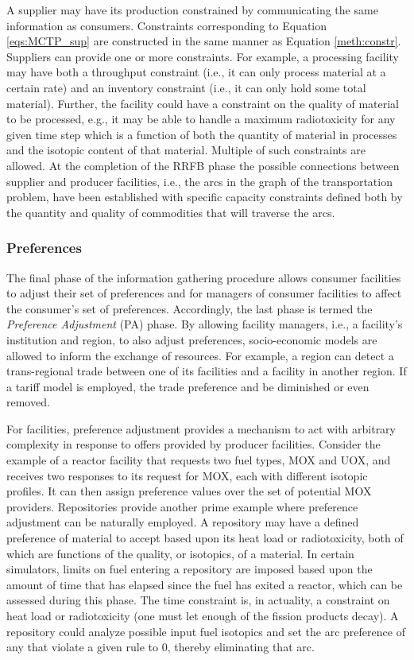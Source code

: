 A supplier may have its production constrained by communicating the same
information as consumers. Constraints corresponding to Equation
\ref{eqs:MCTP_sup} are constructed in the same manner as Equation
\ref{meth:constr}. Suppliers can provide one or more constraints. For example, a
processing facility may have both a throughput constraint (i.e., it can only
process material at a certain rate) and an inventory constraint (i.e., it can
only hold some total material). Further, the facility could have a constraint on
the quality of material to be processed, e.g., it may be able to handle a
maximum radiotoxicity for any given time step which is a function of both the
quantity of material in processes and the isotopic content of that
material. Multiple of such constraints are allowed. At the completion of the
RRFB phase the possible connections between supplier and producer facilities,
i.e., the arcs in the graph of the transportation problem, have been established
with specific capacity constraints defined both by the quantity and quality of
commodities that will traverse the arcs.

\subsubsection{Preferences}

The final phase of the information gathering procedure allows consumer
facilities to adjust their set of preferences and for managers of consumer
facilities to affect the consumer's set of preferences. Accordingly, the last
phase is termed the \textit{Preference Adjustment} (PA) phase. By allowing
facility managers, i.e., a facility's institution and region, to also adjust  %
preferences, socio-economic models are allowed to inform the exchange of
resources. For example, a region can detect a trans-regional trade between one of
its facilities and a facility in another region. If a tariff model is employed,
the trade preference and be diminished or even removed.

For facilities, preference adjustment provides a mechanism to act with arbitrary
complexity in response to offers provided by producer facilities. Consider the
example of a reactor facility that requests two fuel types, MOX and UOX, and
receives two responses to its request for MOX, each with different isotopic
profiles. It can then assign preference values over the set of potential MOX
providers. Repositories provide another prime example where preference
adjustment can be naturally employed. A repository may have a defined preference
of material to accept based upon its heat load or radiotoxicity, both of which
are functions of the quality, or isotopics, of a material. In certain
simulators, limits on fuel entering a repository are imposed based upon the
amount of time that has elapsed since the fuel has exited a reactor, which can
be assessed during this phase. The time constraint is, in actuality, a
constraint on heat load or radiotoxicity (one must let enough of the fission
products decay). A repository could analyze possible input fuel isotopics and
set the arc preference of any that violate a given rule to 0, thereby
eliminating that arc.

